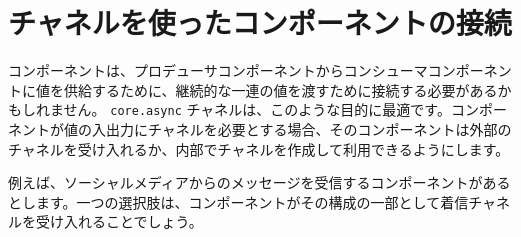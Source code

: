 \section{チャネルを使ったコンポーネントの接続}

コンポーネントは、プロデューサコンポーネントからコンシューマコンポーネントに値を供給するために、継続的な一連の値を渡すために接続する必要があるかもしれません。 \texttt{core.async} チャネルは、このような目的に最適です。コンポーネントが値の入出力にチャネルを必要とする場合、そのコンポーネントは外部のチャネルを受け入れるか、内部でチャネルを作成して利用できるようにします。

例えば、ソーシャルメディアからのメッセージを受信するコンポーネントがあるとします。一つの選択肢は、コンポーネントがその構成の一部として着信チャネルを受け入れることでしょう。
